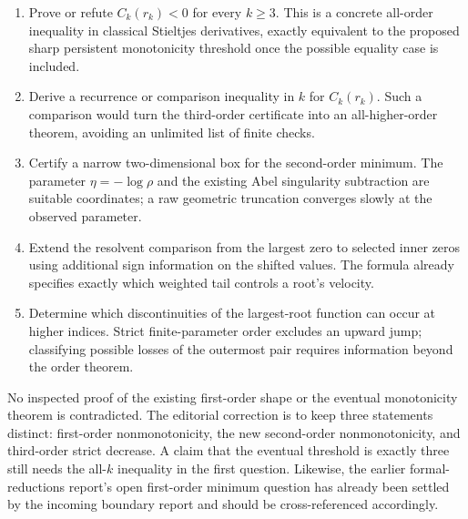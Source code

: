 \begin{enumerate}
\item Prove or refute $C_k(r_k)<0$ for every $k\geq3$. This is a
      concrete all-order inequality in classical Stieltjes derivatives,
      exactly equivalent to the proposed sharp persistent monotonicity
      threshold once the possible equality case is included.
\item Derive a recurrence or comparison inequality in $k$ for
      $C_k(r_k)$. Such a comparison would turn the third-order certificate
      into an all-higher-order theorem, avoiding an unlimited list of
      finite checks.
\item Certify a narrow two-dimensional box for the second-order minimum.
      The parameter $\eta=-\log\rho$ and the existing Abel singularity
      subtraction are suitable coordinates; a raw geometric truncation
      converges slowly at the observed parameter.
\item Extend the resolvent comparison from the largest zero to selected
      inner zeros using additional sign information on the shifted
      values. The formula already specifies exactly which weighted
      tail controls a root's velocity.
\item Determine which discontinuities of the largest-root function can
      occur at higher indices. Strict finite-parameter order excludes
      an upward jump; classifying possible losses of the outermost pair
      requires information beyond the order theorem.
\end{enumerate}

No inspected proof of the existing first-order shape or the eventual
monotonicity theorem is contradicted. The editorial correction is to
keep three statements distinct: first-order nonmonotonicity, the new
second-order nonmonotonicity, and third-order strict decrease. A claim
that the eventual threshold is exactly three still needs the all-$k$
inequality in the first question. Likewise, the earlier formal-reductions
report's open first-order minimum question has already been settled by
the incoming boundary report and should be cross-referenced accordingly.
